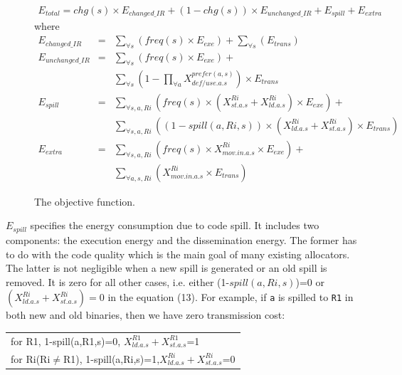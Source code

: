 \begin{figure}[htbp]
\begin{small}
\begin{eqnarray}
E_{total} = 
chg(s) \times E_{changed\_IR} + (1-chg(s))\times E_{unchanged\_IR} +
E_{spill} + E_{extra}  \label{totalE}
\end{eqnarray}
where
\begin{eqnarray}
E_{changed\_IR} &= &\sum_{\forall s} (freq(s) \times E_{exe}) +
\sum_{\forall s}(E_{trans})  \label{cE}\\
%
E_{unchanged\_IR} &= & \sum_{\forall s} (freq(s) \times E_{exe}) + \nonumber\\ 
									&  & \sum_{\forall s}(1-\prod_{\forall a}{X_{def/use.a.s}^{prefer(a,s)}}) \times 					E_{trans} \label{uE}\\
%
E_{spill} &=& \sum_{\forall s, a, Ri}
(freq(s) \times (X_{st.a.s}^{Ri}+X_{ld.a.s}^{Ri}) \times E_{exe}) + \nonumber\\
					& & \sum_{\forall s, a, Ri}( (1-spill(a,Ri,s)) \times
 (X_{ld.a.s}^{Ri}+X_{st.a.s}^{Ri}) \times E_{trans})  \\
E_{extra} &=& \sum_{\forall s, a, Ri}
(freq(s) \times X_{mov.in.a.s}^{Ri} \times E_{exe}) + \nonumber\\
					& &\sum_{\forall a, s, Ri} (X_{mov.in.a.s}^{Ri} \times E_{trans}) 
\end{eqnarray}
\end{small}
\caption{The objective function.}
\label{feqn}
\end{figure}

$E_{spill}$ specifies the energy consumption due to code spill. It
includes two components: the execution energy and the dissemination
energy. The former has to do with the code quality which is the main
goal of many existing allocators. The latter is not negligible when a
new spill is generated or an old spill is removed. It is zero for all
other cases, i.e. either (1-$spill(a,Ri,s)$)=0 or
$(X_{ld.a.s}^{Ri}+X_{st.a.s}^{Ri})=0$ in the equation (13).  For
example, if {\tt a} is spilled to {\tt R1} in both new and old
binaries, then we have zero transmission cost:

\vspace{+0.1in}
\begin{tabular}{l}
for R1, 1-spill(a,R1,s)=0, $X_{ld.a.s}^{R1}+X_{st.a.s}^{R1}$=1\\ for
Ri(Ri$\neq$R1), 1-spill(a,Ri,s)=1,$X_{ld.a.s}^{Ri}+X_{st.a.s}^{Ri}$=0
\\
\end{tabular}
\vspace{+0.1in}

